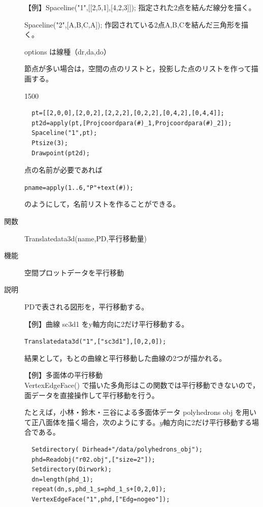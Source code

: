 \documentclass[papersize,a4paper,12pt,uplatex]{jsarticle}
\begin{document}
\begin{description}
\vspace{\baselineskip}
【例】Spaceline("1",[[2,5,1],[4,2,3]]);   指定された2点を結んだ線分を描く。

Spaceline("2",[A,B,C,A]);  作図されている2点A,B,Cを結んだ三角形を描く。

options は線種（dr,da,do）

節点が多い場合は，空間の点のリストと，投影した点のリストを作って描画する。

\begin{layer}{150}{0}
\end{layer}
\begin{verbatim}
  pt=[[2,0,0],[2,0,2],[2,2,2],[0,2,2],[0,4,2],[0,4,4]];
  pt2d=apply(pt,[Projcoordpara(#)_1,Projcoordpara(#)_2]);
  Spaceline("1",pt);
  Ptsize(3);
  Drawpoint(pt2d);
\end{verbatim}

点の名前が必要であれば

\verb|pname=apply(1..6,"P"+text(#));|

のようにして，名前リストを作ることができる。

\vspace{\baselineskip}
\hypertarget{translatedata3d}{}
\item[関数]  Translatedata3d(name,PD,平行移動量)
\item[機能]  空間プロットデータを平行移動
\item[説明]  PDで表される図形を，平行移動する。

\vspace{\baselineskip}
【例】曲線 sc3d1 をy軸方向に2だけ平行移動する。

\verb|Translatedata3d("1",["sc3d1"],[0,2,0]);|
    
結果として，もとの曲線と平行移動した曲線の2つが描かれる。

\vspace{\baselineskip}
【例】多面体の平行移動\\
VertexEdgeFace() で描いた多角形はこの関数では平行移動できないので，面データを直接操作して平行移動を行う。
  
たとえば，小林・鈴木・三谷による多面体データ  polyhedrons obj  を用いて正八面体を描く場合，次のようにする。$y$軸方向に2だけ平行移動する場合である。

\begin{verbatim}
  Setdirectory( Dirhead+"/data/polyhedrons_obj");
  phd=Readobj("r02.obj",["size=2"]);
  Setdirectory(Dirwork);
  dn=length(phd_1);
  repeat(dn,s,phd_1_s=phd_1_s+[0,2,0]);
  VertexEdgeFace("1",phd,["Edg=nogeo"]);
\end{verbatim}
      \begin{center}  \end{center}


\end{description}
\end{document}
